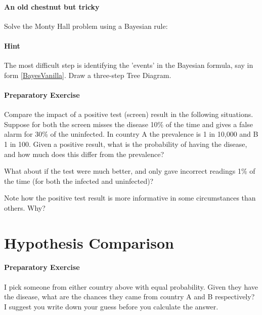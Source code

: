 \documentclass{article}
\begin{document}
\begin{Exercise}
    \paragraph{An old chestnut but tricky}
    Solve the Monty Hall problem using a Bayesian rule:
    
    \paragraph{Hint}
    The most difficult step is identifying the 'events' in the Bayesian formula, say in form \eqref{BayesVanilla}. Draw a three-step Tree Diagram.
\end{Exercise}

\begin{Exercise}
\paragraph{Preparatory Exercise}
Compare the impact of a positive test (screen) result in the following situations. Suppose for both the screen misses the disease 10\% of the time and gives a false alarm for 30\% of the uninfected. In country A the prevalence is 1 in 10,000 and B 1 in 100. Given a positive result, what is the probability of having the disease, and how much does this differ from the prevalence?

What about if the test were much better, and only gave incorrect readings 1\% of the time (for both the infected and uninfected)? 

Note how the positive test result is more informative in some circumstances than others. Why?
\end{Exercise}



\section{Hypothesis Comparison}
\begin{Exercise}
\paragraph{Preparatory Exercise}
I pick someone from either country above with equal probability. Given they have the disease, what are the chances they came from country A and B respectively? I suggest you write down your guess before you calculate the answer.
\end{Exercise}
\end{document}
